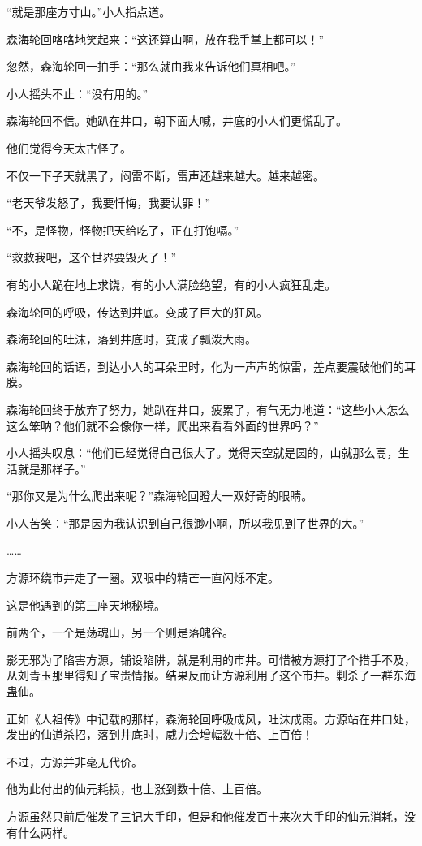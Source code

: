 \begin{this_body}
“就是那座方寸山。”小人指点道。

森海轮回咯咯地笑起来：“这还算山啊，放在我手掌上都可以！”

忽然，森海轮回一拍手：“那么就由我来告诉他们真相吧。”

小人摇头不止：“没有用的。”

森海轮回不信。她趴在井口，朝下面大喊，井底的小人们更慌乱了。

他们觉得今天太古怪了。

不仅一下子天就黑了，闷雷不断，雷声还越来越大。越来越密。

“老天爷发怒了，我要忏悔，我要认罪！”

“不，是怪物，怪物把天给吃了，正在打饱嗝。”

“救救我吧，这个世界要毁灭了！”

有的小人跪在地上求饶，有的小人满脸绝望，有的小人疯狂乱走。

森海轮回的呼吸，传达到井底。变成了巨大的狂风。

森海轮回的吐沫，落到井底时，变成了瓢泼大雨。

森海轮回的话语，到达小人的耳朵里时，化为一声声的惊雷，差点要震破他们的耳膜。

森海轮回终于放弃了努力，她趴在井口，疲累了，有气无力地道：“这些小人怎么这么笨呐？他们就不会像你一样，爬出来看看外面的世界吗？”

小人摇头叹息：“他们已经觉得自己很大了。觉得天空就是圆的，山就那么高，生活就是那样子。”

“那你又是为什么爬出来呢？”森海轮回瞪大一双好奇的眼睛。

小人苦笑：“那是因为我认识到自己很渺小啊，所以我见到了世界的大。”

……

方源环绕市井走了一圈。双眼中的精芒一直闪烁不定。

这是他遇到的第三座天地秘境。

前两个，一个是荡魂山，另一个则是落魄谷。

影无邪为了陷害方源，铺设陷阱，就是利用的市井。可惜被方源打了个措手不及，从刘青玉那里得知了宝贵情报。结果反而让方源利用了这个市井。剿杀了一群东海蛊仙。

正如《人祖传》中记载的那样，森海轮回呼吸成风，吐沫成雨。方源站在井口处，发出的仙道杀招，落到井底时，威力会增幅数十倍、上百倍！

不过，方源并非毫无代价。

他为此付出的仙元耗损，也上涨到数十倍、上百倍。

方源虽然只前后催发了三记大手印，但是和他催发百十来次大手印的仙元消耗，没有什么两样。


\end{this_body}
